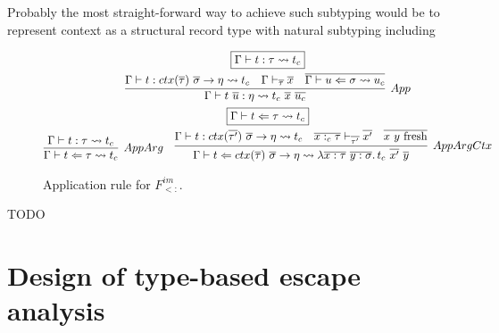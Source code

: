 \documentclass[acmsmall]{acmart}
\newcommand{\mathframebox}[1]{\framebox{$\displaystyle #1$}}
\newcommand{\ap}{~}
\newcommand{\step}{\rightsquigarrow}
\begin{document}
Probably the most straight-forward way to achieve such subtyping would be to represent context as a structural record type with natural subtyping including

\begin{figure}
    \begin{gather*}
        \mathframebox{\Gamma\vdash t : \tau \step t_c} \\
        \infer[App]{
            \Gamma\vdash t\ap\overline{u} : \eta \step t_c \ap \overline{x} \ap \overline{u_c}
        }{
            \Gamma\vdash t : ctx(\overline{\tau})~\overline{\sigma}\to \eta \step t_c
            &
            \Gamma \vdash_{\overline{\tau}} \overline{x}
            &
            \overline{\Gamma\vdash u \Leftarrow \sigma \step u_c}
        } \\
        \mathframebox{\Gamma\vdash t \Leftarrow \tau \step t_c} \\
        \infer[AppArg]{
            \Gamma\vdash t \Leftarrow \tau \step t_c
        }{
            \Gamma\vdash t : \tau \step t_c
        }
        \text{\hspace{1em}}
        \infer[AppArgCtx]{
            \Gamma \vdash t \Leftarrow ctx(\overline{\tau}) ~\overline{\sigma}\to\eta\step \lambda \overline{x : \tau}~\overline{y : \sigma}\ldotp t_c\ap \overline{x'}\ap\overline{y}
        }{
            \Gamma \vdash t : ctx(\overline{\tau'}) ~\overline{\sigma}\to\eta \step t_c
            &
            \overline{x :_c \tau} \vdash_{\overline{\tau'}} \overline{x'}
            &
            \overline{x~y \text{ fresh}}
        }
    \end{gather*}
    \caption{Application rule for $F^{im}_{<:}$.}
    \label{sig:fim-sub-app}
\end{figure}





TODO %


\section{Design of type-based escape analysis} \label{sec:escape}
\end{document}
